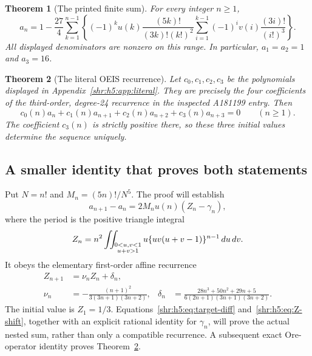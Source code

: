 \documentclass[11pt,letterpaper]{article}
\numberwithin{equation}{section}
\newtheorem{theorem}{Theorem}[section]
\theoremstyle{definition}
\newcommand{\1}{\mathbf 1}
\newcommand{\dd}{\,d}
\begin{document}
\begin{theorem}[The printed finite sum]\label{shr:h5:thm:sum}
For every integer $n\ge1$,
\begin{equation}
 a_n=1-\frac{27}{4}\sum_{k=1}^{n-1}
 \left\{(-1)^k u(k)\frac{(5k)!}{(3k)!(k!)^2}
 \sum_{i=1}^{k-1}(-1)^i v(i)\frac{(3i)!}{(i!)^3}\right\}.
 \label{shr:h5:eq:main-sum}
\end{equation}
All displayed denominators are nonzero on this range. In particular,
$a_1=a_2=1$ and $a_3=16$.
\end{theorem}

\begin{theorem}[The literal OEIS recurrence]\label{shr:h5:thm:operator}
Let $c_0,c_1,c_2,c_3$ be the polynomials displayed in
Appendix~\ref{shr:h5:app:literal}. They are precisely the four coefficients of the
third-order, degree-24 recurrence in the inspected A181199 entry. Then
\begin{equation}
 c_0(n)a_n+c_1(n)a_{n+1}+c_2(n)a_{n+2}+c_3(n)a_{n+3}=0
 \qquad(n\ge1).
 \label{shr:h5:eq:literal-rec}
\end{equation}
The coefficient $c_3(n)$ is strictly positive there, so these three initial
values determine the sequence uniquely.
\end{theorem}

\subsection{A smaller identity that proves both statements}
Put $N=n!$ and $M_n=(5n)!/N^5$. The proof will establish
\begin{equation}
 a_{n+1}-a_n=2M_nu(n)(Z_n-\gamma_n),
 \label{shr:h5:eq:target-diff}
\end{equation}
where the period is the positive triangle integral
\begin{equation}
 Z_n=n^2\iint_{\substack{0<u,v<1\cr u+v>1}}
      u\{uv(u+v-1)\}^{n-1}\dd u\dd v.
 \label{shr:h5:eq:triangle}
\end{equation}
It obeys the elementary first-order affine recurrence
\begin{align}
 Z_{n+1}&=\nu_nZ_n+\delta_n,\\
 \nu_n&=-\frac{(n+1)^2}{3(3n+1)(3n+2)},&
 \delta_n&=\frac{28n^3+50n^2+29n+5}
 {6(2n+1)(3n+1)(3n+2)}.
 \label{shr:h5:eq:Z-shift}
\end{align}
The initial value is $Z_1=1/3$. Equations~\eqref{shr:h5:eq:target-diff}
and~\eqref{shr:h5:eq:Z-shift}, together with an explicit rational identity for
$\gamma_n$, will prove the actual nested sum, rather than only a compatible
recurrence. A subsequent exact Ore-operator identity proves
Theorem~\ref{shr:h5:thm:operator}.
\end{document}
